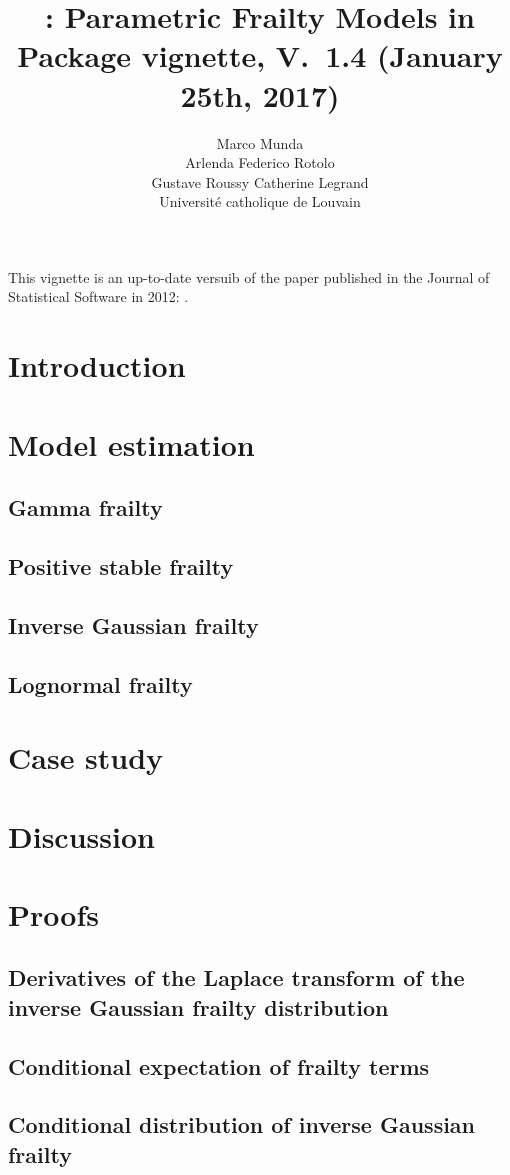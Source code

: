 \documentclass[nojss]{jss}
\author{Marco Munda\\Arlenda \And 
        Federico Rotolo\\Gustave Roussy \And
        Catherine Legrand\\Universit\'e catholique de Louvain}
\title{\pkg{parfm}: Parametric Frailty Models in \proglang{R}
        \\[.5em]\small{Package vignette, V.~1.4 (January 25th, 2017)}}
\begin{document}
This vignette is an up-to-date versuib of the paper
    published in the Journal of Statistical Software in 2012:
\cite{MundaEtal12}.

\section{Introduction}
  \label{sec:intro}
  

\section{Model estimation}
  \label{sec:model}
    
  \clearpage
  \subsection{Gamma frailty}
    \label{sec:model:gamma}
    
  \subsection{Positive stable frailty}
    \label{sec:model:PS}
    
  \subsection{Inverse Gaussian frailty}
    \label{sec:model:IG}
    
  \subsection{Lognormal frailty}
    \label{sec:model:LN}
    

\section{Case study}
  \label{sec:rexample}
  

\section{Discussion}
  \label{sec:concl}
  


% 


\clearpage
\appendix
\section{Proofs}
\subsection{Derivatives of the Laplace transform of the inverse Gaussian frailty distribution}
  \label{app:derLTIG}
  

\clearpage
\subsection{Conditional expectation of frailty terms}
  \label{app:condEfrailty}
  

\clearpage
\subsection{Conditional distribution of inverse Gaussian frailty}
  \label{app:condIG}
  
\end{document}

